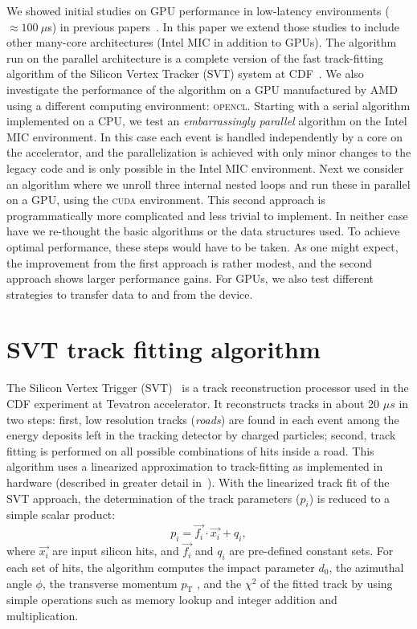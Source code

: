 \documentclass[journal]{IEEEtran}
\begin{document}
We showed initial studies on GPU performance in low-latency
environments ($\approx 100~\mu$s) in previous
papers~\cite{TIPP2011,NSS2012}.  In this paper we extend those studies
to include other many-core architectures (Intel MIC in addition to
GPUs).  The algorithm run on the parallel architecture is a complete
version of the fast track-fitting algorithm of the Silicon Vertex
Tracker (SVT) system at CDF~\cite{SVT1}.
We also investigate the performance of the algorithm on a GPU manufactured by AMD using a different
computing environment: \textsc{opencl}.
Starting with a serial algorithm
implemented on a CPU, we test an \textit{embarrassingly parallel}
algorithm on the Intel MIC environment. In this case each event is
handled independently by a core on the accelerator, and the
parallelization is achieved with only minor changes to the legacy code
and is only possible in the Intel MIC environment. Next we consider an
algorithm where we unroll three internal nested loops and run these in
parallel on a GPU, using the \textsc{cuda} environment. This second
approach is programmatically more complicated and less trivial to
implement. In neither case have we re-thought the basic algorithms or
the data structures used. To achieve optimal performance, these steps
would have to be taken.  As one might expect, the improvement from the
first approach is rather modest, and the second approach shows larger
performance gains. For GPUs, we also test different strategies to transfer
data to and from the device.


\section{SVT track fitting algorithm}
The Silicon Vertex Trigger (SVT)~\cite{SVT1,SVT2} is a track
reconstruction processor used in the CDF experiment at Tevatron
accelerator. It reconstructs tracks in about 20 $\mu s$ in two steps:
first, low resolution tracks (\textit{roads}) are found in each event
among the energy deposits left in the tracking detector by charged
particles; second, track fitting is performed on all possible
combinations of hits inside a road.  This algorithm uses a linearized
approximation to track-fitting as implemented in hardware (described
in greater detail in~\cite{SVT3}).  With the linearized track fit of
the SVT approach, the determination of the track parameters ($p_i$) is
reduced to a simple scalar product:
\[
p_i = \vec{f_i} \cdot \vec{x_i} + q_i,
\]
where $\vec{x_i}$ are input silicon hits, and $\vec{f_i}$ and $q_i$ are 
pre-defined constant sets. For each set of hits, the algorithm
computes the impact parameter $d_0$, the azimuthal angle $\phi$, 
the transverse momentum $p_\mathrm{T}$ , and the $\chi^2$ of the
fitted track by using simple operations such as memory lookup and 
integer addition and multiplication.
\end{document}
